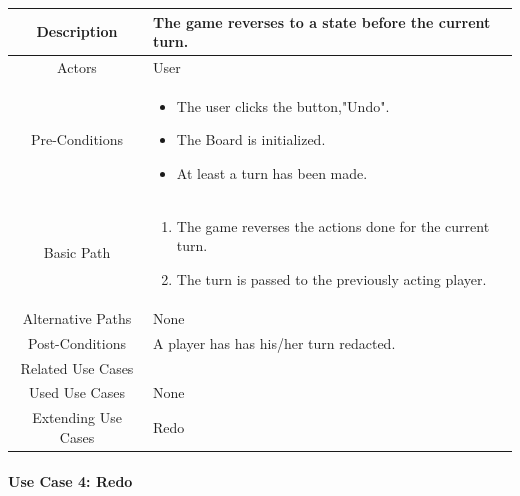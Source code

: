 \documentclass[10pt, a4paper]{article}
\begin{document}
			\begin{center}
				\begin{tabular}{ |c|p{10cm}| } 
					\hline
					Description & The game reverses to a state before the current turn. \\
					\hline 
					Actors & User \\
					\hline  
					Pre-Conditions & \begin{itemize}[noitemsep,topsep=0pt]
						\item The user clicks the button,"Undo".
						\item The Board is initialized.
						\item At least a turn has been made.
					\end{itemize} \\
					\hline  
					Basic Path & 
					\begin{enumerate}
						\item The game reverses the actions done for the current turn.
						\item The turn is passed to the previously acting player.
					\end{enumerate}\\
					\hline
					Alternative Paths & None \\
					\hline
					Post-Conditions & A player has has his/her turn redacted.\\
					\hline 
					Related Use Cases & \\
					\hline 
					Used Use Cases & None\\
					\hline 
					Extending Use Cases & Redo \\
					\hline 
				\end{tabular}
			\end{center}
			
			\newpage
			
			\paragraph{Use Case 4: Redo}
			
\end{document}
